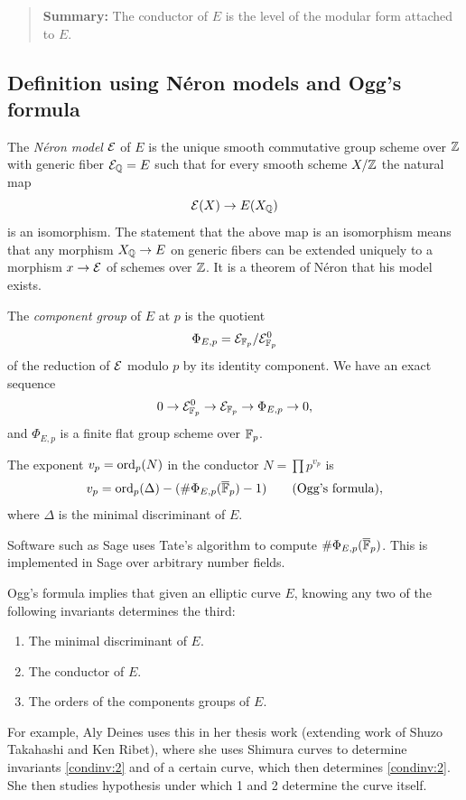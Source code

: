 \documentclass{book}
\begin{document}
\begin{quote}
{\bf Summary:} The conductor of $E$ is the level of the modular
form attached to $E$.
\end{quote}




\subsection{Definition using N\'eron models and Ogg's formula}\label{sec:neronogg}

The {\em N\'eron model} $\mathcal{E}$ of $E$ is the unique
smooth commutative group scheme over $\mathbb{Z}$ with
generic fiber $\mathcal{E}_{\mathbb{Q}} = E$ such that for every smooth
scheme $X/\mathbb{Z}$ the natural map
$$
\mathcal{E}(X) \to E(X_{\mathbb{Q}})
$$
is an isomorphism.  The statement that the above
map is an isomorphism means that any morphism
$X_{\mathbb{Q}} \to E$ on generic fibers
can be extended uniquely to a morphism
$x \to \mathcal{E}$ of schemes over $\mathbb{Z}$.
It is a theorem of N\'eron that his model exists.

The {\em component group} of $E$ at $p$ is the quotient
$$
 \Phi_{E,p} = \mathcal{E}_{\mathbb{F}_p} / \mathcal{E}_{\mathbb{F}_p}^0
$$
of the reduction of $\mathcal{E}$ modulo $p$ by its identity component.
We have an exact sequence
$$
 0 \to \mathcal{E}_{\mathbb{F}_p}^0 \to \mathcal{E}_{\mathbb{F}_p} \to \Phi_{E,p} \to 0,
$$
and $\Phi_{E,p}$ is a finite flat group scheme over $\mathbb{F}_p$.

The exponent $v_p=\operatorname{ord}_p(N)$ in the conductor $N=\prod p^{v_p}$ is
$$
v_p = \operatorname{ord}_p(\Delta) - (\#\Phi_{E,p}(\overline{\mathbb{F}}_p) - 1) \qquad\text{(Ogg's formula)},
$$
where $\Delta$ is the minimal discriminant of $E$.

Software such as Sage uses Tate's algorithm to compute
$\#\Phi_{E,p}(\overline{\mathbb{F}}_p)$.  This is implemented in Sage over
arbitrary number fields.

Ogg's formula implies that given an elliptic curve $E$,
knowing any two of the following invariants determines the third:
\begin{enumerate}
\item\label{condinv:1} The minimal discriminant of $E$.
\item\label{condinv:2}  The conductor of $E$.
\item\label{condinv:3}  The orders of the components groups of $E$.
\end{enumerate}
For example, Aly Deines uses this in her thesis work (extending
work of Shuzo Takahashi and Ken Ribet),
where she uses Shimura curves to determine invariants
\ref{condinv:2} and \label{condinv:3} of a certain curve,
which then determines \ref{condinv:2}.
She then studies hypothesis under which 1 and
2 determine the curve itself.
\end{document}
